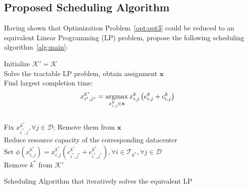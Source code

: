 \subsection{Proposed Scheduling Algorithm}

Having shown that Optimization Problem~\ref{opt:opt3} could be reduced to an equivalent Linear Programming (LP) problem, \citet{Chen2017} propose the following scheduling algorithm~\autoref{alg:main}:

\begin{algorithm}[H]
  \label{alg:main}

  Initialize \(\mathcal{K}' = \mathcal{K}\) \\
   {
    Solve the tractable LP problem, obtain assignment \(\mathbf{x}\) \\
    Find largest completion time: \[x_{i^*, j^*}^{k^*} = \operatorname*{\arg\!\max}\limits_{x_{i, j}^k \in\mathbf{x}} x_{i, j}^k\left(e^k_{i, j} + c^k_{i, j}\right)\] \\
    Fix \(x_{i^*, j}^{k^*},\forall j\in\mathcal{D}\); Remove them from \(\mathbf{x}\) \\
    Reduce resource capacity of the corresponding datacenter \\
    Set \(\phi\left(x^{k^*}_{i, j}\right) = x^{k^*}_{i, j}\left(c^{k^*}_{i^*, j^*} + e^{k^*}_{i^*, j^*}\right),\forall i\in \mathcal{T}_{k^*}, \forall j\in \mathcal{D}\) \\
    Remove \(k^*\) from \(\mathcal{K}'\)
  }
  \caption{Scheduling Algorithm that iteratively solves the equivalent LP}
\end{algorithm}

